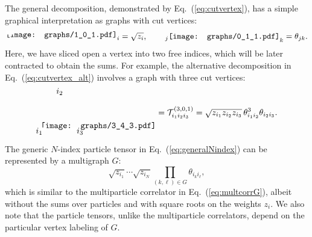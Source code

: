 \documentclass[aps,prd,floatfix,preprintnumbers,twocolumn,groupedaddress,nofootinbib,longbibliography,10pt]{revtex4-1}
\DeclareRobustCommand{\Eq}[1]{Eq.~(\ref{#1})}
\DeclareRobustCommand{\edgegraph}[1]{\begin{gathered}\texttt{[image: graphs/0\_1\_1.pdf]}\end{gathered}}
\begin{document}
The general decomposition, demonstrated by \Eq{eq:cutvertex}, has a simple graphical interpretation as graphs with cut vertices:
%
\begin{equation}
\begin{tikzpicture}[      
        every node/.style={anchor=south west,inner sep=0pt},
        x=1mm, y=1mm,
      ]   
     \node (fig2) at (3,3)
       {\texttt{[image: graphs/1\_0\_1.pdf]}};  
     \draw [fill=patchcolor,patchcolor] (3.25,5) rectangle (6.5,6.5);
\end{tikzpicture}_i = \sqrt{z_i}, \quad \quad \,_j\edgegraph{0.2}_k = \theta_{jk}.
\end{equation}
%
Here, we have sliced open a vertex into two free indices, which will be later contracted to obtain the sums.
%
For example, the alternative decomposition in \Eq{eq:cutvertex_alt} involves a graph with three cut vertices:
\begin{equation}
\begin{gathered}
\begin{tikzpicture}[      
        every node/.style={anchor=south west,inner sep=0pt},
        x=1mm, y=1mm,
      ]   
     \node (fig2) at (3,3)
       {\texttt{[image: graphs/3\_4\_3.pdf]}};  
     \draw [fill=patchcolor,patchcolor] (3,3) rectangle (5.5,4);
	\node[text width=0.05cm] at (1,1) {$i_1$} ;
     \draw [fill=patchcolor,patchcolor] (15.5,3) rectangle (18,4);
	\node[text width=0.05cm] at (18,1) {$i_3$} ;
     \draw [fill=patchcolor,patchcolor] (9.5,16.7) rectangle (11.5,17.5);
	\node[text width=0.05cm] at (9.5,17.5) {$i_2$} ;
\end{tikzpicture}\end{gathered}
 = \mathcal{T}_{i_1i_2i_3}^{(3,0,1)} = \sqrt{z_{i_1}z_{i_2}z_{i_3}} \, \theta_{i_1i_2}^3 \theta_{i_2i_3}.
\label{eq:examplehamburger}
\end{equation}
%
The generic $N$-index particle tensor in \Eq{eq:generalNindex} can be represented by a multigraph $G$:
%
\begin{equation}
\sqrt{z_{i_1}}\cdots \sqrt{z_{i_N}} \prod_{(k,\ell)\in G}\theta_{i_k i_\ell},
\end{equation}
%
which is similar to the multiparticle correlator in \Eq{eq:multcorrG}, albeit without the sums over particles and with square roots on the weights $z_i$.
%
We also note that the particle tensors, unlike the multiparticle correlators, depend on the particular vertex labeling of $G$.
\end{document}
